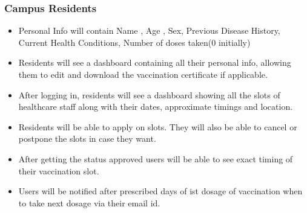 \documentclass[10pt,twocolumn,letterpaper]{article}
\begin{document}
\subsubsection{Campus Residents}
\begin{itemize}
    \item Personal Info will contain Name , Age , Sex, Previous Disease History, Current Health Conditions, Number of doses taken(0 initially)
    \item Residents will see a dashboard containing all their personal info, allowing them to edit and download the vaccination certificate if applicable.
    \item After logging in, residents will see a dashboard showing all the slots of healthcare staff along with their dates, approximate timings and location.
    \item Residents will be able to apply on slots. They will also be able to cancel or postpone the slots in case they want.
    \item After getting the status approved users will be able to see exact timing of their vaccination slot.
    \item Users will be notified after prescribed days of ist dosage of vaccination when to take next dosage via their email id.
\end{itemize}
\end{document}
